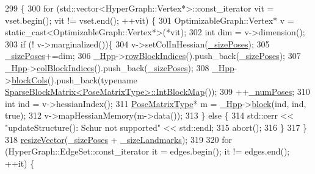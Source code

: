 \begin{DoxyCode}
299 \{
300   \textcolor{keywordflow}{for} (std::vector<HyperGraph::Vertex*>::const\_iterator vit = vset.begin(); vit != vset.end(); ++vit) \{
301     OptimizableGraph::Vertex* v = \textcolor{keyword}{static\_cast<}OptimizableGraph::Vertex*\textcolor{keyword}{>}(*vit);
302     \textcolor{keywordtype}{int} dim = v->dimension();
303     \textcolor{keywordflow}{if} (! v->marginalized())\{
304       v->setColInHessian(\hyperlink{classg2o_1_1BlockSolver_a39ec000379885ce09cdd8c23ab6d4567}{\_sizePoses});
305       \hyperlink{classg2o_1_1BlockSolver_a39ec000379885ce09cdd8c23ab6d4567}{\_sizePoses}+=dim;
306       \hyperlink{classg2o_1_1BlockSolver_ac222d4342825ed8632a87b4f5be94618}{\_Hpp}->\hyperlink{classg2o_1_1SparseBlockMatrix_ab9f9e621c9bca7c660c61b3948b8ece3}{rowBlockIndices}().push\_back(\hyperlink{classg2o_1_1BlockSolver_a39ec000379885ce09cdd8c23ab6d4567}{\_sizePoses});
307       \hyperlink{classg2o_1_1BlockSolver_ac222d4342825ed8632a87b4f5be94618}{\_Hpp}->\hyperlink{classg2o_1_1SparseBlockMatrix_adfaf13a5f3134205a58c8346a09a672a}{colBlockIndices}().push\_back(\hyperlink{classg2o_1_1BlockSolver_a39ec000379885ce09cdd8c23ab6d4567}{\_sizePoses});
308       \hyperlink{classg2o_1_1BlockSolver_ac222d4342825ed8632a87b4f5be94618}{\_Hpp}->\hyperlink{classg2o_1_1SparseBlockMatrix_a8e53797223fff106487d0b0080a3e36e}{blockCols}().push\_back(\textcolor{keyword}{typename} 
      \hyperlink{classg2o_1_1SparseBlockMatrix_aaa6ca1ae454ed70f62992b6401645f4e}{SparseBlockMatrix<PoseMatrixType>::IntBlockMap}());
309       ++\hyperlink{classg2o_1_1BlockSolver_a709259fc290d746f4174d25410b7458a}{\_numPoses};
310       \textcolor{keywordtype}{int} ind = v->hessianIndex();
311       \hyperlink{classg2o_1_1BlockSolver_a8c7c43d361bd31e3e0353889ba703bc0}{PoseMatrixType}* m = \hyperlink{classg2o_1_1BlockSolver_ac222d4342825ed8632a87b4f5be94618}{\_Hpp}->\hyperlink{classg2o_1_1SparseBlockMatrix_aaca7b38d2e9a18eebf9e6f5957af0cf7}{block}(ind, ind, \textcolor{keyword}{true});
312       v->mapHessianMemory(m->data());
313     \} \textcolor{keywordflow}{else} \{
314       std::cerr << \textcolor{stringliteral}{"updateStructure(): Schur not supported"} << std::endl;
315       abort();
316     \}
317   \}
318   \hyperlink{classg2o_1_1Solver_ad1f85839e85f3e2c49112fb7e2b843ad}{resizeVector}(\hyperlink{classg2o_1_1BlockSolver_a39ec000379885ce09cdd8c23ab6d4567}{\_sizePoses} + \hyperlink{classg2o_1_1BlockSolver_a13a49b5aac8ae3b12ed0c349fc0788e7}{\_sizeLandmarks});
319 
320   \textcolor{keywordflow}{for} (HyperGraph::EdgeSet::const\_iterator it = edges.begin(); it != edges.end(); ++it) \{

\end{DoxyCode}
